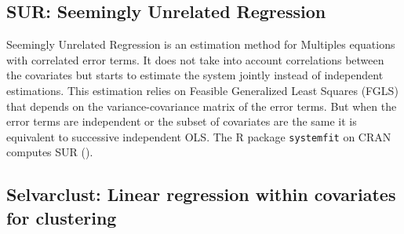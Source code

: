 \documentclass[12pt,a4paper]{report}
\begin{document}
		\subsection{SUR: Seemingly Unrelated Regression}		%
		Seemingly Unrelated Regression \cite{SURzellner} is an estimation method for Multiples equations with correlated error terms. It does not take into account correlations between the covariates but starts to estimate the system jointly instead of independent estimations. This estimation relies on Feasible Generalized Least Squares (FGLS) that depends on the variance-covariance matrix of the error terms. But when the error terms are independent or the subset of covariates are the same it is equivalent to successive independent OLS. The R package {\tt systemfit} on CRAN computes SUR (\cite{packagesystemfit}). 
%			
%
		\subsection{Selvarclust: Linear regression within covariates for clustering}		%
\end{document}
